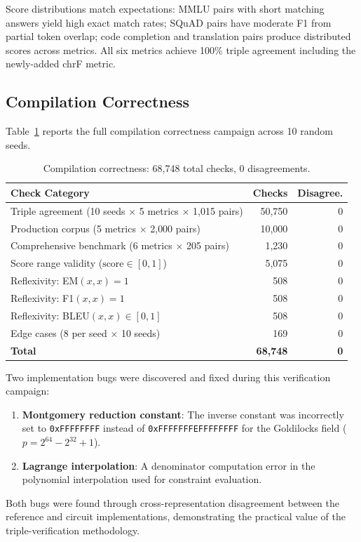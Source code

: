 \documentclass[11pt]{article}
\begin{document}
Score distributions match expectations: MMLU pairs with short matching
answers yield high exact match rates; SQuAD pairs have moderate F1
from partial token overlap; code completion and translation pairs
produce distributed scores across metrics.  All six metrics achieve
100\% triple agreement including the newly-added chrF metric.

\subsection{Compilation Correctness}

Table~\ref{tab:compilation} reports the full compilation correctness
campaign across 10 random seeds.

\begin{table}[t]
\centering
\caption{Compilation correctness: 68{,}748 total checks, 0 disagreements.}
\label{tab:compilation}
\smallskip
\begin{tabular}{@{}lrr@{}}
\toprule
\textbf{Check Category} & \textbf{Checks} & \textbf{Disagree.} \\
\midrule
Triple agreement (10 seeds $\times$ 5 metrics $\times$ 1{,}015 pairs) & 50{,}750 & 0 \\
Production corpus (5 metrics $\times$ 2{,}000 pairs) & 10{,}000 & 0 \\
Comprehensive benchmark (6 metrics $\times$ 205 pairs) & 1{,}230 & 0 \\
Score range validity ($\text{score} \in [0,1]$) & 5{,}075 & 0 \\
Reflexivity: EM$(x,x) = 1$ & 508 & 0 \\
Reflexivity: F1$(x,x) = 1$ & 508 & 0 \\
Reflexivity: BLEU$(x,x) \in [0,1]$ & 508 & 0 \\
Edge cases (8 per seed $\times$ 10 seeds) & 169 & 0 \\
\midrule
\textbf{Total} & \textbf{68{,}748} & \textbf{0} \\
\bottomrule
\end{tabular}
\end{table}

Two implementation bugs were discovered and fixed during this
verification campaign:
\begin{enumerate}[nosep]
\item \textbf{Montgomery reduction constant}: The inverse constant
  was incorrectly set to \texttt{0xFFFFFFFF} instead of
  \texttt{0xFFFFFFFEFFFFFFFF} for the Goldilocks field
  ($p = 2^{64} - 2^{32} + 1$).
\item \textbf{Lagrange interpolation}: A denominator computation error
  in the polynomial interpolation used for constraint evaluation.
\end{enumerate}
Both bugs were found through cross-representation disagreement between
the reference and circuit implementations, demonstrating the practical
value of the triple-verification methodology.
\end{document}

